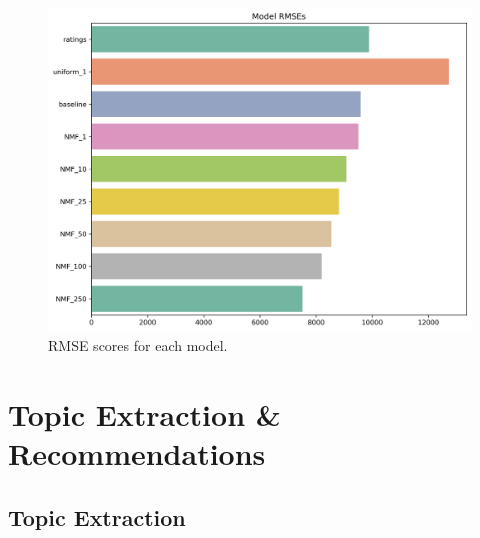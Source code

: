\documentclass[handout]{beamer}
\begin{document}
\begin{frame}
 
\begin{figure}[h]
    \includegraphics[width=0.8\linewidth]{../image/goodreads-models/model-rmses.png}
    \caption[RMSE Comparison]{RMSE scores for each model.}
     \label{fig:rmse}
\end{figure}
\end{frame}

\section{Topic Extraction \& Recommendations}

\subsection{Topic Extraction}
\end{document}
